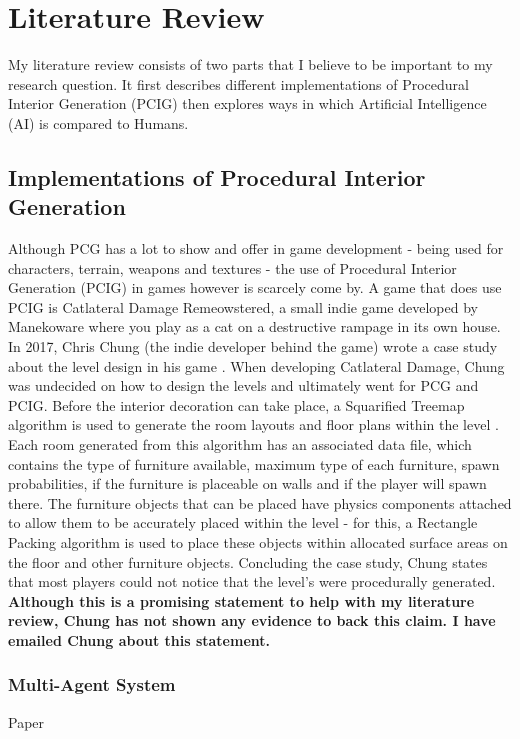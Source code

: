 \section{Literature Review}
My literature review consists of two parts that I believe to be important to my research question.
It first describes different implementations of Procedural Interior Generation (PCIG) then explores
ways in which Artificial Intelligence (AI) is compared to Humans.

\subsection{Implementations of Procedural Interior Generation}
Although PCG has a lot to show and offer in game development - being used for
characters, terrain, weapons and textures - the use of Procedural Interior Generation 
(PCIG) in games however is scarcely come by.
A game that does use PCIG is Catlateral Damage Remeowstered\cite{game:catlateral},
a small indie game developed by Manekoware where you play as a cat on a destructive rampage 
in its own house.
In 2017, Chris Chung (the indie developer behind the game) wrote a case study about the level design in his game \cite{what-is-pcg}.
When developing Catlateral Damage, Chung was 
undecided on how to design the levels and ultimately went for PCG and PCIG\cite{pcg_in_gd}.
Before the interior decoration can take place, a Squarified Treemap algorithm 
is used to generate the room layouts and floor plans within the level \cite{squarified-treemap}.
Each room generated from this algorithm has an associated data file, which contains the type of furniture available, maximum type of each furniture, spawn probabilities, if the furniture is placeable on walls and if the player will spawn there.
The furniture objects that can be placed have physics components attached to allow them to be accurately placed within the level -
for this, a Rectangle Packing algorithm is used to place these objects within allocated surface areas on the floor and other furniture objects.
Concluding the case study, Chung states that most players could not notice that the level's were procedurally generated.
\textbf{Although this is a promising statement to help with my literature review, Chung has not shown any evidence to back this claim. I have emailed Chung about this statement.}


\subsubsection*{Multi-Agent System}
Paper \cite{real-time-walkthroughs}
